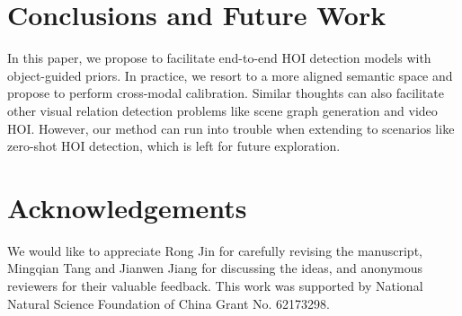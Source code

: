 \documentclass[letterpaper]{article} \usepackage{aaai22}  \usepackage{times}  \usepackage{helvet}  \usepackage{courier}  \usepackage[hyphens]{url}  \usepackage{graphicx} \urlstyle{rm} \def\UrlFont{\rm}  \usepackage{natbib}  \usepackage{caption} \DeclareCaptionStyle{ruled}{labelfont=normalfont,labelsep=colon,strut=off} \frenchspacing  \setlength{\pdfpagewidth}{8.5in}  \setlength{\pdfpageheight}{11in}  \usepackage{algorithm}
\begin{document}
\section{Conclusions and Future Work}
In this paper, we propose to facilitate end-to-end HOI detection models with object-guided priors. In practice, we resort to a more aligned semantic space and propose to perform cross-modal calibration. Similar thoughts can also facilitate other visual relation detection problems like scene graph generation and video HOI. However, our method can run into trouble when extending to scenarios like zero-shot HOI detection, which is left for future exploration. 


\section*{Acknowledgements}
We would like to appreciate Rong Jin for carefully revising the manuscript, Mingqian Tang and Jianwen Jiang for discussing the ideas, and anonymous reviewers for their valuable feedback. This work was supported by National Natural Science Foundation of China Grant No. 62173298.



\small
 
\end{document}
